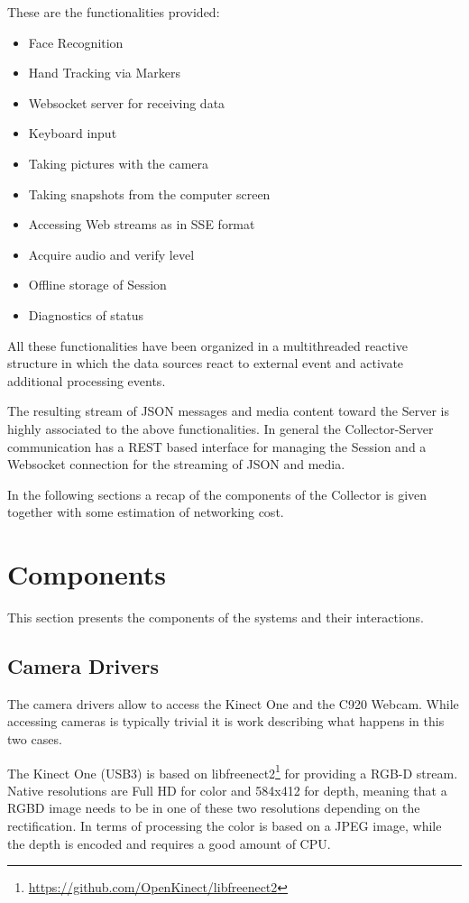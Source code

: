 \documentclass[a4paper,notitlepage,onecolumn]{hitec}  %
\begin{document}
These are the functionalities provided:

\begin{itemize}
	\item Face Recognition
	\item Hand Tracking via Markers
	\item Websocket server for receiving data
	\item Keyboard input
	\item Taking pictures with the camera
	\item Taking snapshots from the computer screen
	\item Accessing Web streams as in SSE format
	\item Acquire audio and verify level
	\item Offline storage of Session
	\item Diagnostics of status
\end{itemize}

All these functionalities have been organized in a multithreaded reactive structure in which the data sources react to external event and activate additional processing events.

The resulting stream of JSON messages and media content toward the Server is highly associated to the above functionalities. In general the Collector-Server communication has a REST based interface for managing the Session and a Websocket connection for the streaming of JSON and media.

In the following sections a recap of the components of the Collector is given together with some estimation of networking cost.

\section{Components}

This section presents the components of the systems and their interactions. 

\subsection{Camera Drivers}
The camera drivers allow to access the Kinect One and the C920 Webcam. While accessing cameras is typically trivial it is work describing what happens in this two cases.

The Kinect One (USB3) is based on libfreenect2\footnote{\url{https://github.com/OpenKinect/libfreenect2}} for providing a RGB-D stream. Native resolutions are Full HD for color and 584x412 for depth, meaning that a RGBD image needs to be in one of these two resolutions depending on the rectification. In terms of processing the color is based on a JPEG image, while the depth is encoded and requires a good amount of CPU.
\end{document}
